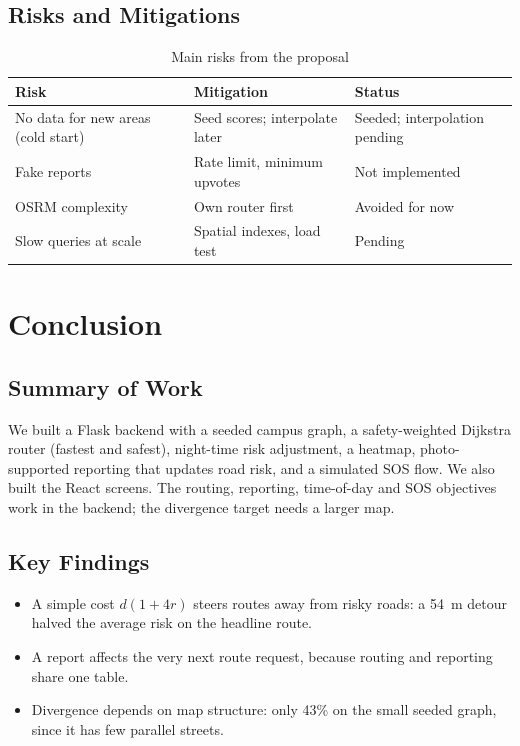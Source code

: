 \documentclass{tietreport}
\begin{document}
\section{Risks and Mitigations}

\begin{table}[h]
\centering
\small
\begin{tabular}{|p{3.2cm}|p{4.6cm}|p{4.6cm}|}
  \hline
  \textbf{Risk} & \textbf{Mitigation} & \textbf{Status} \\ \hline
  No data for new areas (cold start) & Seed scores; interpolate later &
    Seeded; interpolation pending \\ \hline
  Fake reports & Rate limit, minimum upvotes & Not implemented \\ \hline
  OSRM complexity & Own router first & Avoided for now \\ \hline
  Slow queries at scale & Spatial indexes, load test & Pending \\ \hline
\end{tabular}
\caption{Main risks from the proposal}
\label{tab:risks}
\end{table}

\chapter{Conclusion}

\section{Summary of Work}

We built a Flask backend with a seeded campus graph, a safety-weighted
Dijkstra router (fastest and safest), night-time risk adjustment, a
heatmap, photo-supported reporting that updates road risk, and a
simulated SOS flow. We also built the React screens. The routing,
reporting, time-of-day and SOS objectives work in the backend; the
divergence target needs a larger map.

\section{Key Findings}

\begin{itemize}
  \item A simple cost $d(1+4r)$ steers routes away from risky roads: a
    54~m detour halved the average risk on the headline route.
  \item A report affects the very next route request, because routing
    and reporting share one table.
  \item Divergence depends on map structure: only 43\% on the small
    seeded graph, since it has few parallel streets.
\end{itemize}
\end{document}
